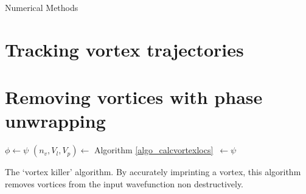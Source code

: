 \begin{chapter}{\label{cha:numerics}Numerical Methods}
\section{\label{section:vortextracking} Tracking vortex trajectories}
\section{\label{section:vortexremoval} Removing vortices with phase unwrapping}
	\begin{algorithm}[H]
	\BlankLine
	$\phi \leftarrow \psi$\;
	$(n_v,V_l,V_p)\leftarrow$ Algorithm \ref{algo_calcvortexlocs}~$\leftarrow\psi$\;


	\caption{The `vortex killer' algorithm. By accurately imprinting a vortex, this algorithm removes vortices from the input wavefunction non destructively.}\label{algo_vortexkiller}
	\end{algorithm}

\end{chapter}
